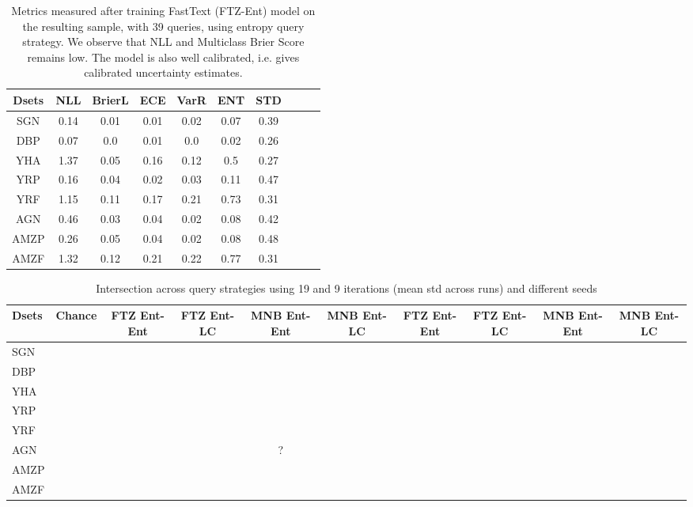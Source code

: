 \documentclass[11pt,a4paper]{article}
\begin{document}
\begin{table}[t]
\begin{center}
\small\addtolength{\tabcolsep}{-2pt}
\begin{tabular}{|c|c|c|c|c|c|c|c|c|c|}
\hline
Dsets & NLL & BrierL & ECE &  VarR & ENT & STD  \\ \hline
SGN & 0.14 &  0.01 & 0.01  & 0.02 & 0.07 & 0.39   \\ \hline
DBP  & 0.07 &  0.0 & 0.01 &  0.0 & 0.02 & 0.26 \\ \hline
YHA  & 1.37 &  0.05 & 0.16 &  0.12 & 0.5 & 0.27   \\ \hline
YRP  & 0.16 &  0.04 & 0.02  & 0.03 & 0.11 & 0.47 \\ \hline
YRF & 1.15 & 0.11 & 0.17 & 0.21 & 0.73 & 0.31 \\ \hline
AGN & 0.46 &  0.03 & 0.04 & 0.02 & 0.08 & 0.42 \\ \hline
AMZP & 0.26 &  0.05 & 0.04 & 0.02 & 0.08 & 0.48  \\ \hline
AMZF  & 1.32 & 0.12 & 0.21 & 0.22 & 0.77 & 0.31  \\ \hline
\end{tabular}
\caption{\label{font-table} Metrics measured after training FastText (FTZ-Ent) model on the resulting sample, with 39 queries, using entropy query strategy. We observe that NLL and Multiclass Brier Score remains low. The model is also well calibrated, i.e. gives calibrated uncertainty estimates.}
\label{tab:measures}
\end{center}
\end{table}
\begin{table*}[t]
\small\addtolength{\tabcolsep}{-4.5pt}
\begin{tabular}{|l|c||c|c|c|c||c|c|c|c||}
\hline
Dsets & Chance & FTZ Ent-Ent & FTZ Ent-LC & MNB Ent-Ent & MNB Ent-LC   & FTZ Ent-Ent & FTZ Ent-LC & MNB Ent-Ent & MNB Ent-LC \\ \hline
 SGN &  &   &  &  &   &   &  &  &  \\ \hline 
DBP &  &   &  &  &  &   &  &  &  \\ \hline 
  YHA &  &   &  &  &   &  &  &  &  \\ \hline 
  YRP &  &   &  &  &   &   &  &  & \\ \hline 
  YRF &  &   &  &  &   &   &  &  & \\ \hline 
  AGN  &  &   &  & ? &    &   &  &  &  \\ \hline 
  AMZP &  &   &  &  &   &  &  &  &  \\ \hline 
  AMZF &  &  &  &  &   &   &  &  & \\ \hline 
\end{tabular}
\caption{Intersection across query strategies using 19 and 9 iterations (mean  std across runs) and different seeds} 
\label{tab:query_acquisition}
\end{table*}
\end{document}
